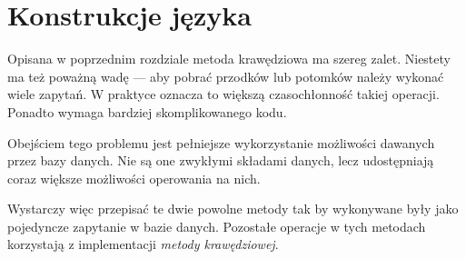 \chapter{Konstrukcje języka}

% 
% 
% 


Opisana w poprzednim rozdziale metoda krawędziowa ma szereg zalet.
Niestety ma też poważną wadę --- aby pobrać przodków lub potomków należy wykonać wiele zapytań.
W praktyce oznacza to większą czasochłonność takiej operacji. 
Ponadto wymaga bardziej skomplikowanego kodu.

Obejściem tego problemu jest pełniejsze wykorzystanie możliwości dawanych przez bazy danych.
Nie są one zwykłymi składami danych, lecz udostępniają coraz większe możliwości operowania na nich.

Wystarczy więc przepisać te dwie powolne metody tak by wykonywane były jako pojedyncze zapytanie w bazie danych.
Pozostałe operacje w tych metodach korzystają z implementacji \emph{metody krawędziowej}.

